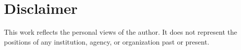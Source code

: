 \section*{Disclaimer}
This work reflects the personal views of the author. It does not represent the
 positions of any institution, agency, or organization past or present.


